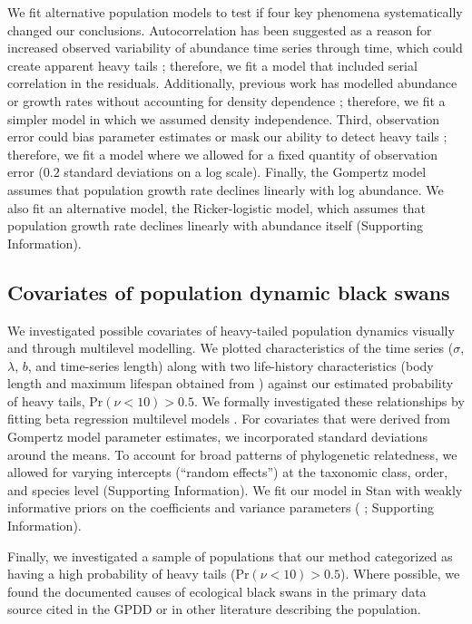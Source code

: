We fit alternative population models to test if four key phenomena systematically changed our conclusions. Autocorrelation has been suggested as a reason for increased observed variability of abundance time series through time, which could create apparent heavy tails \citep{inchausti2002}; therefore, we fit a model that included serial correlation in the residuals. Additionally, previous work has modelled abundance or growth rates without accounting for density dependence \citep{halley2002,segura2013}; therefore, we fit a simpler model in which we assumed density independence. Third, observation error could bias parameter estimates \citep{knape2012} or mask our ability to detect heavy tails \citep{ward2007}; therefore, we fit a model where we allowed for a fixed quantity of observation error ($0.2$ standard deviations on a log scale). Finally, the Gompertz model assumes that population growth rate declines linearly with log abundance. We also fit an alternative model, the Ricker-logistic model, which assumes that population growth rate declines linearly with abundance itself (Supporting Information).

\subsection{Covariates of population dynamic black swans}

We investigated possible covariates of heavy-tailed population dynamics visually and through multilevel modelling. We plotted characteristics of the time series ($\sigma$, $\lambda$, $b$, and time-series length) along with two life-history characteristics (body length and maximum lifespan obtained from \citet{brook2006a}) against our estimated probability of heavy tails, Pr$(\nu < 10) > 0.5$. We formally investigated these relationships by fitting beta regression multilevel models \citep{ferrari2004}. For covariates that were derived from Gompertz model parameter estimates, we incorporated standard deviations around the means. To account for broad patterns of phylogenetic relatedness, we allowed for varying intercepts (``random effects'') at the taxonomic class, order, and species level (Supporting Information). We fit our model in Stan with weakly informative priors on the coefficients \citep{gelman2008d} and variance parameters (\citeauthor{gelman2006c} \citeyear{gelman2006c} \citeauthor{gelman2014} \citeyear{gelman2014}; Supporting Information).

Finally, we investigated a sample of populations that our method categorized as having a high probability of heavy tails (Pr$(\nu < 10) > 0.5$). Where possible, we found the documented causes of ecological black swans in the primary data source cited in the GPDD or in other literature describing the population. 

